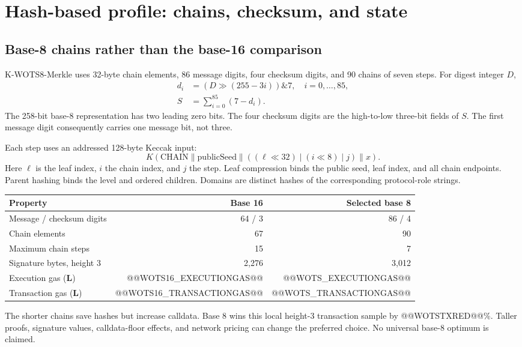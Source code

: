 \documentclass[11pt,a4paper]{article}
\newcommand{\local}{\textbf{L}}
\begin{document}
\newpage
\section{Hash-based profile: chains, checksum, and state}
\subsection{Base-8 chains rather than the base-16 comparison}
K-WOTS8-Merkle uses 32-byte chain elements, 86 message digits, four checksum
digits, and 90 chains of seven steps. For digest integer $D$,
\begin{align}
 d_i &= (D\gg(255-3i))\mathbin{\&}7,\quad i=0,\ldots,85,\\
 S &= \sum_{i=0}^{85}(7-d_i).
\end{align}
The 258-bit base-8 representation has two leading zero bits. The four
checksum digits are the high-to-low three-bit fields of $S$. The first
message digit consequently carries one message bit, not three.

Each step uses an addressed 128-byte Keccak input:
\begin{equation*}
 K(\mathrm{CHAIN}\parallel\mathrm{publicSeed}\parallel
   ((\ell\ll32)\mathbin{|}(i\ll8)\mathbin{|}j)\parallel x).
\end{equation*}
Here $\ell$ is the leaf index, $i$ the chain index, and $j$ the step. Leaf
compression binds the public seed, leaf index, and all chain endpoints.
Parent hashing binds the level and ordered children. Domains are distinct
hashes of the corresponding protocol-role strings.

\begin{tabularx}{\linewidth}{Yrr}
\toprule
\textbf{Property} & \textbf{Base 16} & \textbf{Selected base 8}\\
\midrule
Message / checksum digits & 64 / 3 & 86 / 4\\
Chain elements & 67 & 90\\
Maximum chain steps & 15 & 7\\
Signature bytes, height 3 & 2,276 & 3,012\\
Execution gas (\local) & @@WOTS16_EXECUTIONGAS@@ & @@WOTS_EXECUTIONGAS@@\\
Transaction gas (\local) & @@WOTS16_TRANSACTIONGAS@@ & @@WOTS_TRANSACTIONGAS@@\\
\bottomrule
\end{tabularx}

The shorter chains save hashes but increase calldata. Base 8 wins this local
height-3 transaction sample by @@WOTSTXRED@@\%. Taller proofs, signature
values, calldata-floor effects, and network pricing can change the preferred
choice. No universal base-8 optimum is claimed.
\end{document}

